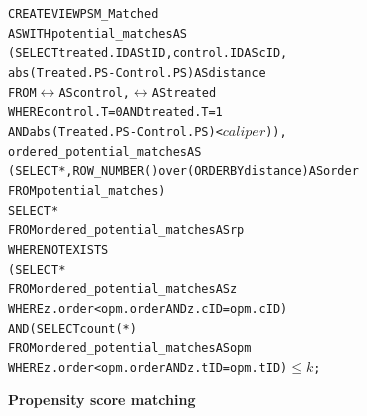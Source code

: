 \begin{figure} 
  \centering
\begin{alltt} \tiny
CREATE VIEW PSM_Matched
AS WITH potential_matches AS
  (SELECT treated.ID AS tID, control.ID AS cID,
          abs(Treated.PS-Control.PS)  AS distance
   FROM \(\rel\) AS control, \(\rel\) AS treated
   WHERE control.T=0 AND treated.T=1
     AND abs(Treated.PS-Control.PS) < \(caliper\))),
            ordered_potential_matches AS
  (SELECT *, ROW_NUMBER() over (ORDER BY distance) AS order
   FROM potential_matches)
SELECT *
FROM ordered_potential_matches AS rp
WHERE NOT EXISTS
    (SELECT *
     FROM ordered_potential_matches AS z
     WHERE z.order < opm.order AND z.cID=opm.cID)
  AND (SELECT count(*)
     FROM ordered_potential_matches AS opm
     WHERE z.order < opm.order AND z.tID=opm.tID)\( \leq k\);
\end{alltt} \vspace{-.3cm}
  \caption{\bf Propensity score matching}\label{fig:nnmnr}
\end{figure}



